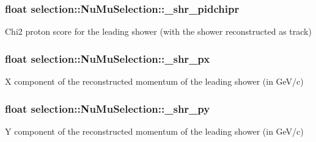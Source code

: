\subsubsection[{\texorpdfstring{\+\_\+shr\+\_\+pidchipr}{_shr_pidchipr}}]{\setlength{\rightskip}{0pt plus 5cm}float selection\+::\+Nu\+Mu\+Selection\+::\+\_\+shr\+\_\+pidchipr\hspace{0.3cm}{\ttfamily [private]}}\hypertarget{classselection_1_1NuMuSelection_aaf417a519bc8ecc0d965ac58aff47417}{}\label{classselection_1_1NuMuSelection_aaf417a519bc8ecc0d965ac58aff47417}
Chi2 proton score for the leading shower (with the shower reconstructed as track) 
\subsubsection[{\texorpdfstring{\+\_\+shr\+\_\+px}{_shr_px}}]{\setlength{\rightskip}{0pt plus 5cm}float selection\+::\+Nu\+Mu\+Selection\+::\+\_\+shr\+\_\+px\hspace{0.3cm}{\ttfamily [private]}}\hypertarget{classselection_1_1NuMuSelection_a847713ed8d6765bae1c2f6f590af875d}{}\label{classselection_1_1NuMuSelection_a847713ed8d6765bae1c2f6f590af875d}
X component of the reconstructed momentum of the leading shower (in Ge\+V/c) 
\subsubsection[{\texorpdfstring{\+\_\+shr\+\_\+py}{_shr_py}}]{\setlength{\rightskip}{0pt plus 5cm}float selection\+::\+Nu\+Mu\+Selection\+::\+\_\+shr\+\_\+py\hspace{0.3cm}{\ttfamily [private]}}\hypertarget{classselection_1_1NuMuSelection_ac3c72fc9664d3d214a2775a5aa812fbf}{}\label{classselection_1_1NuMuSelection_ac3c72fc9664d3d214a2775a5aa812fbf}
Y component of the reconstructed momentum of the leading shower (in Ge\+V/c) 
